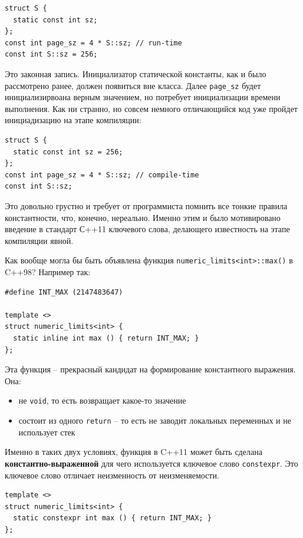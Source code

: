 \documentclass[a4paper,12pt,oneside]{article}
\begin{document}
\begin{lstlisting}
struct S {
  static const int sz;
};
const int page_sz = 4 * S::sz; // run-time
const int S::sz = 256; 
\end{lstlisting}

Это законная запись. Инициализатор статической константы, как и было рассмотрено ранее, должен появиться вне класса. Далее \lstinline!page_sz! будет инициализирвоана верным значением, но потребует инициализации времени выполнения. Как ни странно, но совсем немного отличающийся код уже пройдет инициадизацию на этапе компиляции:

\begin{lstlisting}
struct S {
  static const int sz = 256;
};
const int page_sz = 4 * S::sz; // compile-time
const int S::sz;
\end{lstlisting}

Это довольно грустно и требует от программиста помнить все тонкие правила константности, что, конечно, нереально. Именно этим и было мотивировано введение в стандарт С++11 ключевого слова, делающего известность на этапе компиляции явной.

Как вообще могла бы быть объявлена функция \lstinline!numeric_limits<int>::max()! в C++98? Например так:

\begin{lstlisting}
#define INT_MAX (2147483647)

template <>
struct numeric_limits<int> {
  static inline int max () { return INT_MAX; }
};
\end{lstlisting}

Эта функция -- прекрасный кандидат на формирование константного выражения. Она:
\begin{itemize}
\item не \lstinline!void!, то есть возвращает какое-то значение
\item состоит из одного \lstinline!return! -- то есть не заводит локальных переменных и не использует стек
\end{itemize}

Именно в таких двух условиях, функция в C++11 может быть сделана \textbf{константно-выраженной} для чего используется ключевое слово \lstinline!constexpr!. Это ключевое слово отличает неизменность от неизменяемости.

\begin{lstlisting}
template <>
struct numeric_limits<int> {
  static constexpr int max () { return INT_MAX; }
};
\end{lstlisting}
\end{document}

